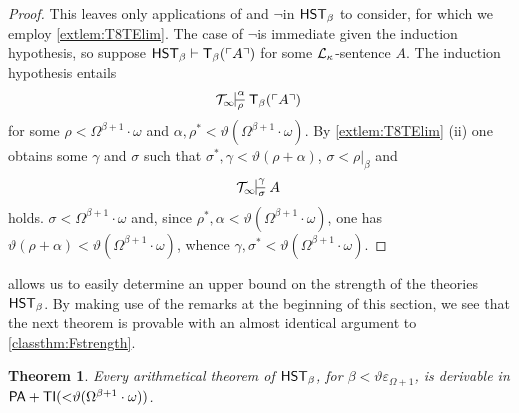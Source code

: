 \documentclass[UKenglish,cleveref,DIV=12]{scrartcl}
\newtheorem{theorem}{Theorem}
\theoremstyle{definition}
\theoremstyle{definition}
\begin{document}
\begin{proof}
This leaves only applications of \Conec\beta and $\lnot$\Conec\beta in
$\mathsf{HST}_\beta$ to consider, for which we employ \cref{extlem:T8TElim}. The case of $\lnot$\Conec\beta is immediate given the induction hypothesis, so suppose
$\mathsf{HST}_\beta\vdash \mathsf{T}_\beta(\ulcorner{A}\urcorner)$
for some $\mathcal{L}_\kappa$-sentence $A$. The induction hypothesis entails
\begin{align}\label{eqn:T8embed5}
  \Tinfty\prov\alpha\rho{\T_\beta(\gn A)}
\end{align}
for some $\rho<\Omega^{\beta+1}\cdot\omega$ and $\alpha,\rho^*<
\vartheta(\Omega^{\beta+1}\cdot\omega)$. By \cref{extlem:T8TElim} (ii) one
obtains some $\gamma$ and $\sigma$ such that $\sigma^*,\gamma<\vartheta(\rho+\alpha)$, $\sigma<\rho|_\beta$ and
\begin{align*}
  \Tinfty\prov\gamma\sigma{A}
\end{align*}
holds. $\sigma<\Omega^{\beta+1}\cdot\omega$ and, since
$\rho^*,\alpha<\vartheta(\Omega^{\beta+1}\cdot\omega)$, one has
$\vartheta(\rho+\alpha)<\vartheta(\Omega^{\beta+1}\cdot\omega)$, whence
$\gamma,\sigma^*<\vartheta(\Omega^{\beta+1}\cdot\omega)$.
\end{proof}
 allows us to easily determine an upper bound on the strength of the theories $\mathsf{HST}_\beta$. By making use of the remarks at the beginning of this section, we see that the next theorem is provable with an almost identical argument to \cref{classthm:Fstrength}.
\begin{theorem}\label{extthm:FbetaupperbdI}
 Every arithmetical theorem of $\mathsf{HST}_\beta$, for $\beta<\vartheta\varepsilon_{\Omega+1}$, is derivable in
$\mathsf{PA}+\mathsf{TI}(\mathord<\vartheta(\Omega^{\beta+1}\cdot\omega))$.
\end{theorem}
%
\end{document}
